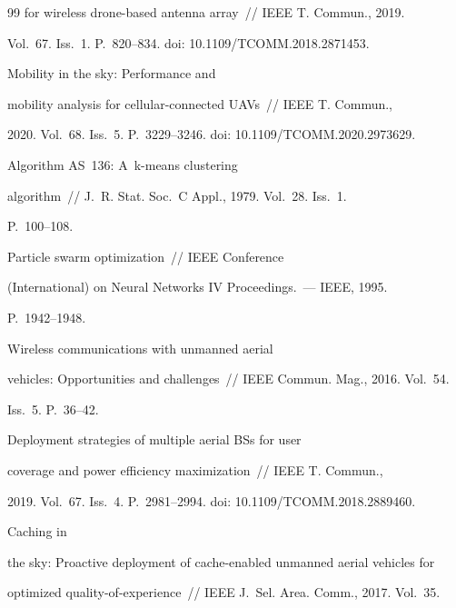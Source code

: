 {{\begin{thebibliography}{99}
for wireless drone-based antenna array~/\!\!/ IEEE T. Commun., 2019. 


Vol.~67. Iss.~1. P.~820--834. doi: 10.1109/TCOMM.2018.2871453.




 Mobility in the sky: Performance and 


mobility analysis for cellular-connected UAVs~/\!\!/ IEEE T. Commun., 


2020. Vol.~68. Iss.~5. P.~3229--3246. doi: 10.1109/TCOMM.2020.2973629.







 Algorithm AS~136: A~k-means clustering 


algorithm~/\!\!/ J.~R. Stat. Soc.~C Appl., 1979. Vol.~28. Iss.~1. 


P.~100--108.




 Particle swarm optimization~/\!\!/  IEEE  Conference  


(International) on Neural Networks IV Proceedings.~--- IEEE, 1995.  


P.~1942--1948.




 Wireless communications with unmanned aerial 


vehicles: Opportunities and challenges~/\!\!/ IEEE Commun. Mag., 2016. Vol.~54. 


Iss.~5. P.~36--42. 




 Deployment strategies of multiple aerial BSs for user 


coverage and power efficiency maximization~/\!\!/ IEEE T. Commun., 


2019. Vol.~67. Iss.~4. P.~2981--2994. doi: 10.1109/TCOMM.2018.2889460.







 Caching in 


the sky: Proactive deployment of cache-enabled unmanned aerial vehicles for 


optimized quality-of-experience~/\!\!/ IEEE J.~Sel. Area. Comm., 2017. Vol.~35. 



\end{thebibliography}}}
